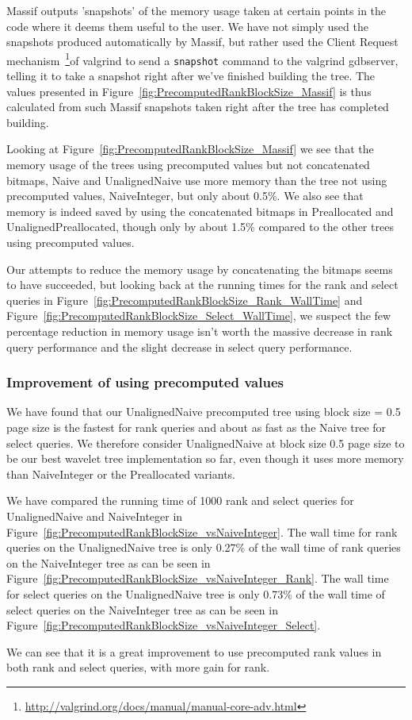 Massif outputs 'snapshots' of the memory usage taken at certain points in the code where it deems them useful to the user.
We have not simply used the snapshots produced automatically by Massif, but rather used the Client Request mechanism~\footnote{\url{http://valgrind.org/docs/manual/manual-core-adv.html}}of valgrind to send a \texttt{snapshot} command to the valgrind gdbserver, telling it to take a snapshot right after we've finished building the tree.
The values presented in Figure~\ref{fig:PrecomputedRankBlockSize_Massif} is thus calculated from such Massif snapshots taken right after the tree has completed building.

Looking at Figure~\ref{fig:PrecomputedRankBlockSize_Massif} we see that the memory usage of the trees using precomputed values but not concatenated bitmaps, Naive and UnalignedNaive use more memory than the tree not using precomputed values, NaiveInteger, but only about 0.5\%.
We also see that memory is indeed saved by using the concatenated bitmaps in Preallocated and UnalignedPreallocated, though only by about 1.5\% compared to the other trees using precomputed values.

Our attempts to reduce the memory usage by concatenating the bitmaps seems to have succeeded, but looking back at the running times for the rank and select queries in Figure~\ref{fig:PrecomputedRankBlockSize_Rank_WallTime} and Figure~\ref{fig:PrecomputedRankBlockSize_Select_WallTime}, we suspect the few percentage reduction in memory usage isn't worth the massive decrease in rank query performance and the slight decrease in select query performance.


\subsubsection{Improvement of using precomputed values}
We have found that our UnalignedNaive precomputed tree using block size = 0.5 page size is the fastest for rank queries and about as fast as the Naive tree for select queries.
We therefore consider UnalignedNaive at block size 0.5 page size to be our best wavelet tree implementation so far, even though it uses more memory than NaiveInteger or the Preallocated variants.

We have compared the running time of 1000 rank and select queries for UnalignedNaive and NaiveInteger in Figure~\ref{fig:PrecomputedRankBlockSize_vsNaiveInteger}.
The wall time for rank queries on the UnalignedNaive tree is only 0.27\% of the wall time of rank queries on the NaiveInteger tree as can be seen in Figure~\ref{fig:PrecomputedRankBlockSize_vsNaiveInteger_Rank}.
The wall time for select queries on the UnalignedNaive tree is only 0.73\% of the wall time of select queries on the NaiveInteger tree as can be seen in Figure~\ref{fig:PrecomputedRankBlockSize_vsNaiveInteger_Select}.

We can see that it is a great improvement to use precomputed rank values in both rank and select queries, with more gain for rank.

